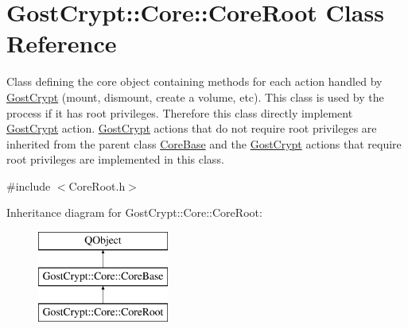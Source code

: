 \hypertarget{class_gost_crypt_1_1_core_1_1_core_root}{}\section{Gost\+Crypt\+:\+:Core\+:\+:Core\+Root Class Reference}
\label{class_gost_crypt_1_1_core_1_1_core_root}


Class defining the core object containing methods for each action handled by \hyperlink{namespace_gost_crypt}{Gost\+Crypt} (mount, dismount, create a volume, etc). This class is used by the process if it has root privileges. Therefore this class directly implement \hyperlink{namespace_gost_crypt}{Gost\+Crypt} action. \hyperlink{namespace_gost_crypt}{Gost\+Crypt} actions that do not require root privileges are inherited from the parent class \hyperlink{class_gost_crypt_1_1_core_1_1_core_base}{Core\+Base} and the \hyperlink{namespace_gost_crypt}{Gost\+Crypt} actions that require root privileges are implemented in this class.  




{\ttfamily \#include $<$Core\+Root.\+h$>$}

Inheritance diagram for Gost\+Crypt\+:\+:Core\+:\+:Core\+Root\+:\begin{figure}[H]
\begin{center}
\leavevmode
\includegraphics[height=3.000000cm]{class_gost_crypt_1_1_core_1_1_core_root}
\end{center}
\end{figure}
